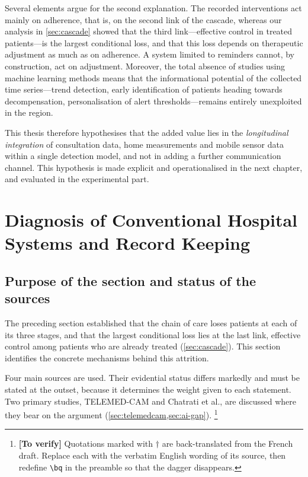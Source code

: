 \documentclass[12pt,a4paper,oneside]{report}
\newcommand{\verify}[1]{\footnote{\textbf{[To verify]} #1}}
\begin{document}
Several elements argue for the second explanation. The recorded interventions act mainly on adherence, that is, on the second link of the cascade, whereas our analysis in \cref{sec:cascade} showed that the third link---effective control in treated patients---is the largest conditional loss, and that this loss depends on therapeutic adjustment as much as on adherence. A system limited to reminders cannot, by construction, act on adjustment. Moreover, the total absence of studies using machine learning methods means that the informational potential of the collected time series---trend detection, early identification of patients heading towards decompensation, personalisation of alert thresholds---remains entirely unexploited in the region.

This thesis therefore hypothesises that the added value lies in the \emph{longitudinal integration} of consultation data, home measurements and mobile sensor data within a single detection model, and not in adding a further communication channel. This hypothesis is made explicit and operationalised in the next chapter, and evaluated in the experimental part.

\section{Diagnosis of Conventional Hospital Systems and Record Keeping}\label{sec:diagnosis}

\subsection*{Purpose of the section and status of the sources}

The preceding section established that the chain of care loses patients at each of its three stages, and that the largest conditional loss lies at the last link, effective control among patients who are already treated (\cref{sec:cascade}). This section identifies the concrete mechanisms behind this attrition.

Four main sources are used. Their evidential status differs markedly and must be stated at the outset, because it determines the weight given to each statement. Two primary studies, TELEMED-CAM and Chatrati et al., are discussed where they bear on the argument (\cref{sec:telemedcam,sec:ai-gap}).%
\verify{Quotations marked with $\dagger$ are back-translated from the French draft. Replace each with the verbatim English wording of its source, then redefine \texttt{\textbackslash bq} in the preamble so that the dagger disappears.}
\end{document}
